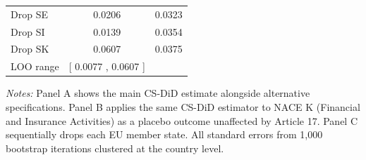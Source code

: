 \begin{table}[htbp]
\begin{tabular}{lcc}
Drop SE & 0.0206 & 0.0323 \\
Drop SI & 0.0139 & 0.0354 \\
Drop SK & 0.0607 & 0.0375 \\
\midrule
LOO range & [ 0.0077 ,  0.0607 ] & \\
\bottomrule
\end{tabular}
\begin{tablenotes}
\small
\item \textit{Notes:} Panel A shows the main CS-DiD estimate alongside alternative specifications. Panel B applies the same CS-DiD estimator to NACE K (Financial and Insurance Activities) as a placebo outcome unaffected by Article 17. Panel C sequentially drops each EU member state. All standard errors from 1,000 bootstrap iterations clustered at the country level.
\end{tablenotes}
\end{table}
